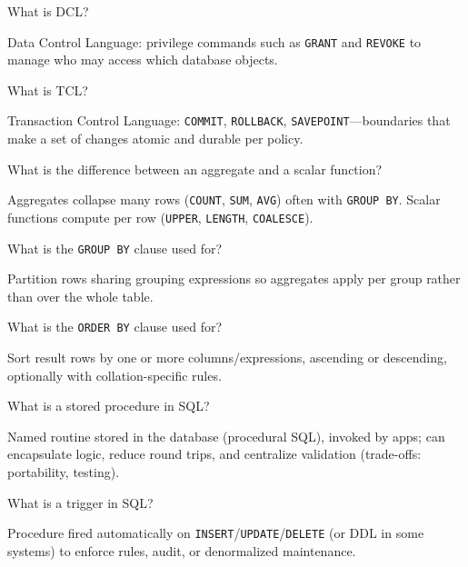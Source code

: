 \question[4]
What is DCL?
\makeemptybox{1in}
\begin{solution}
  Data Control Language: privilege commands such as \texttt{GRANT} and \texttt{REVOKE} to manage who may access which database objects.
\end{solution}

\question[4]
What is TCL?
\makeemptybox{1.05in}
\begin{solution}
  Transaction Control Language: \texttt{COMMIT}, \texttt{ROLLBACK}, \texttt{SAVEPOINT}---boundaries that make a set of changes atomic and durable per policy.
\end{solution}

\question[4]
What is the difference between an aggregate and a scalar function?
\makeemptybox{1.2in}
\begin{solution}
  Aggregates collapse many rows (\texttt{COUNT}, \texttt{SUM}, \texttt{AVG}) often with \texttt{GROUP BY}. Scalar functions compute per row (\texttt{UPPER}, \texttt{LENGTH}, \texttt{COALESCE}).
\end{solution}

\question[4]
What is the \texttt{GROUP BY} clause used for?
\makeemptybox{1.05in}
\begin{solution}
  Partition rows sharing grouping expressions so aggregates apply per group rather than over the whole table.
\end{solution}

\question[4]
What is the \texttt{ORDER BY} clause used for?
\makeemptybox{1in}
\begin{solution}
  Sort result rows by one or more columns/expressions, ascending or descending, optionally with collation-specific rules.
\end{solution}

\question[4]
What is a stored procedure in SQL?
\makeemptybox{1.2in}
\begin{solution}
  Named routine stored in the database (procedural SQL), invoked by apps; can encapsulate logic, reduce round trips, and centralize validation (trade-offs: portability, testing).
\end{solution}

\question[4]
What is a trigger in SQL?
\makeemptybox{1.2in}
\begin{solution}
  Procedure fired automatically on \texttt{INSERT}/\texttt{UPDATE}/\texttt{DELETE} (or DDL in some systems) to enforce rules, audit, or denormalized maintenance.
\end{solution}

